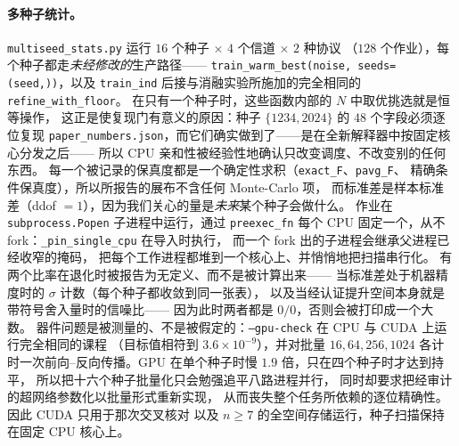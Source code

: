 \documentclass[11pt,a4paper]{article}
\begin{document}
\paragraph{多种子统计。}
\texttt{multiseed\_stats.py} 运行 $16$ 个种子 $\times$ $4$ 个信道 $\times$ $2$ 种协议
（$128$ 个作业），每个种子都走\emph{未经修改的}生产路径——
\texttt{train\_warm\_best(noise, seeds=(seed,))}，以及 \texttt{train\_ind}
后接与消融实验所施加的完全相同的 \texttt{refine\_with\_floor}。
在只有一个种子时，这些函数内部的 $N$ 中取优挑选就是恒等操作，
这正是使复现门有意义的原因：种子 $\{1234,2024\}$ 的 $48$ 个字段必须逐位复现
\texttt{paper\_numbers.json}，而它们确实做到了——是在全新解释器中按固定核心分发之后——
所以 CPU 亲和性被经验性地确认只改变调度、不改变别的任何东西。
每一个被记录的保真度都是一个确定性求积（\texttt{exact\_F}、\texttt{pavg\_F}、
精确条件保真度），所以所报告的展布不含任何 Monte-Carlo 项，
而标准差是样本标准差（ddof $=1$），因为我们关心的量是\emph{未来}某个种子会做什么。
作业在 \texttt{subprocess.Popen} 子进程中运行，通过 \texttt{preexec\_fn}
每个 CPU 固定一个，从不 fork：\texttt{\_pin\_single\_cpu} 在导入时执行，
而一个 fork 出的子进程会继承父进程已经收窄的掩码，
把每个工作进程都堆到一个核心上、并悄悄地把扫描串行化。
有两个比率在退化时被报告为无定义、而不是被计算出来——
当标准差处于机器精度时的 $\sigma$ 计数（每个种子都收敛到同一张表），
以及当经认证提升空间本身就是带符号舍入量时的信噪比——
因为此时两者都是 $0/0$，否则会被打印成一个大数。
器件问题是被测量的、不是被假定的：\texttt{--gpu-check} 在 CPU 与 CUDA 上运行完全相同的课程
（目标值相符到 $3.6\times10^{-9}$），并对批量 $16,64,256,1024$
各计时一次前向--反向传播。GPU 在单个种子时慢 $1.9$ 倍，只在四个种子时才达到持平，
所以把十六个种子批量化只会勉强追平八路进程并行，
同时却要求把经审计的超网络参数化以批量形式重新实现，
从而丧失整个任务所依赖的逐位精确性。因此 CUDA 只用于那次交叉核对
以及 $n\ge7$ 的全空间存储运行，种子扫描保持在固定 CPU 核心上。
\end{document}
